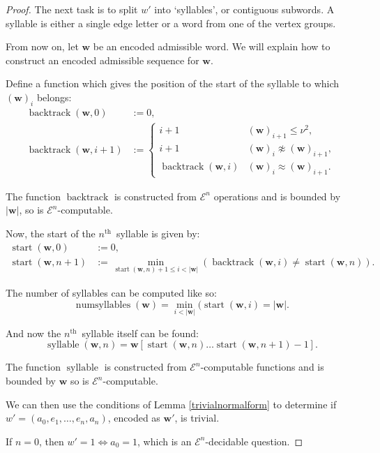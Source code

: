 \documentclass[a4paper]{article}
\newcommand{\grz}[1]{$\mathcal{E}^{#1}$}	%
\newcommand{\nth}{$n^{\textrm{th}}$~}	%
\newcommand{\wvec}{\mathbf{w}}	%
\newcommand{\recur}[1]{\begin{equation} \begin{split} #1 \end{split} \end{equation}}	%
\theoremstyle{plain}
\theoremstyle{definition}
\begin{document}
\begin{proof}
The next task is to split $w'$ into `syllables', or contiguous subwords. A syllable is either a single edge letter or a word from one of the vertex groups.

From now on, let $\wvec$ be an encoded admissible word.  We will explain how to construct an encoded admissible sequence for $\wvec$.

Define a function which gives the position of the start of the syllable to which $(\wvec)_i$ belongs:
\recur{
	\operatorname{backtrack}(\wvec,0) &:= 0, \\
	\operatorname{backtrack}(\wvec,i+1) &:= \begin{cases}
																					i+1	&	(\wvec)_{i+1} \leq \nu^2, \\
																					i+1	&	(\wvec)_i \not \approx (\wvec)_{i+1}, \\
																					\operatorname{backtrack}(\wvec,i)	&	(\wvec)_i \approx (\wvec)_{i+1}.
																				\end{cases}
}

The function $\operatorname{backtrack}$ is constructed from \grz{n} operations and is bounded by $|\wvec|$, so is \grz{n}-computable.

Now, the start of the \nth syllable is given by:
\recur{
\operatorname{start}(\wvec,0) &:= 0, \\
\operatorname{start}(\wvec,n+1) &:= \min_{\operatorname{start}(\wvec,n)+1 \leq i < |\wvec|} (\operatorname{backtrack}(\wvec,i) \neq \operatorname{start}(\wvec,n)).
}

The number of syllables can be computed like so:
\begin{equation} \operatorname{numsyllables}(\wvec) = \min_{i < |\wvec|} ( \operatorname{start}(\wvec,i) = |\wvec|. \end{equation}

And now the \nth syllable itself can be found:
\begin{equation} \operatorname{syllable}(\wvec,n) = \wvec[\operatorname{start}(\wvec,n) \dots \operatorname{start}(\wvec,n+1)-1]. \end{equation}

The function $\operatorname{syllable}$ is constructed from \grz{n}-computable functions and is bounded by $\wvec$ so is \grz{n}-computable.

We can then use the conditions of Lemma \ref{trivialnormalform} to determine if $w' = (a_0,e_1, \dots, e_n, a_n)$, encoded as $\wvec'$, is trivial.

If $n=0$, then $w'=1 \Leftrightarrow a_0=1$, which is an \grz{n}-decidable question.


\end{proof}
\end{document}
